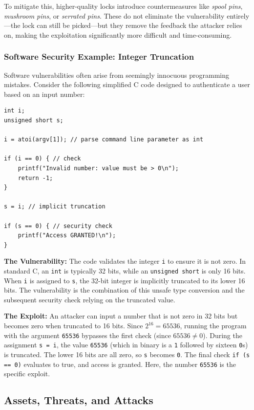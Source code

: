 To mitigate this, higher-quality locks introduce countermeasures like \textit{spool pins}, \textit{mushroom pins}, or \textit{serrated pins}. These do not eliminate the vulnerability entirely---the lock can still be picked---but they remove the feedback the attacker relies on, making the exploitation significantly more difficult and time-consuming.

\subsubsection{Software Security Example: Integer Truncation}
Software vulnerabilities often arise from seemingly innocuous programming mistakes. Consider the following simplified C code designed to authenticate a user based on an input number:

\begin{verbatim}
int i;
unsigned short s;

i = atoi(argv[1]); // parse command line parameter as int

if (i == 0) { // check
    printf("Invalid number: value must be > 0\n");
    return -1;
}

s = i; // implicit truncation

if (s == 0) { // security check
    printf("Access GRANTED!\n");
}
\end{verbatim}

\textbf{The Vulnerability:} The code validates the integer \texttt{i} to ensure it is not zero. In standard C, an \texttt{int} is typically 32 bits, while an \texttt{unsigned short} is only 16 bits. When \texttt{i} is assigned to \texttt{s}, the 32-bit integer is implicitly truncated to its lower 16 bits. The vulnerability is the combination of this unsafe type conversion and the subsequent security check relying on the truncated value.

\textbf{The Exploit:} An attacker can input a number that is not zero in 32 bits but becomes zero when truncated to 16 bits. Since $2^{16} = 65536$, running the program with the argument \texttt{65536} bypasses the first check (since $65536 \neq 0$). During the assignment \texttt{s = i}, the value \texttt{65536} (which in binary is a \texttt{1} followed by sixteen \texttt{0}s) is truncated. The lower 16 bits are all zero, so \texttt{s} becomes \texttt{0}. The final check \texttt{if (s == 0)} evaluates to true, and access is granted. Here, the number \texttt{65536} is the specific exploit.

\subsection{Assets, Threats, and Attacks}

